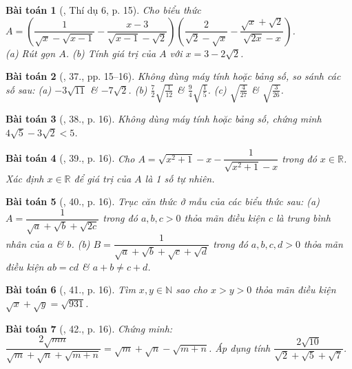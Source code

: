 \documentclass{article}
\newtheorem{baitoan}{Bài toán}
\begin{document}
\begin{baitoan}[\cite{Tuyen_Toan_9}, Thí dụ 6, p. 15]
	Cho biểu thức $A = \left(\dfrac{1}{\sqrt{x} - \sqrt{x - 1}} - \dfrac{x - 3}{\sqrt{x - 1} - \sqrt{2}}\right)\left(\dfrac{2}{\sqrt{2} - \sqrt{x}} - \dfrac{\sqrt{x} + \sqrt{2}}{\sqrt{2x} - x}\right)$.\\(a) Rút gọn $A$. (b) Tính giá trị của $A$ với $x = 3 - 2\sqrt{2}$.
\end{baitoan}

\begin{baitoan}[\cite{Tuyen_Toan_9}, 37., pp. 15--16]
	Không dùng máy tính hoặc bảng số, so sánh các số sau: (a) $-3\sqrt{11}$ \& $-7\sqrt{2}$. (b) $\frac{7}{2}\sqrt{\frac{1}{12}}$ \& $\frac{9}{4}\sqrt{\frac{1}{5}}$. (c) $\sqrt{\frac{4}{27}}$ \& $\sqrt{\frac{3}{26}}$.
\end{baitoan}

\begin{baitoan}[\cite{Tuyen_Toan_9}, 38., p. 16]
	Không dùng máy tính hoặc bảng số, chứng minh $4\sqrt{5} - 3\sqrt{2} < 5$.
\end{baitoan}

\begin{baitoan}[\cite{Tuyen_Toan_9}, 39., p. 16]
	Cho $A = \sqrt{x^2 + 1} - x - \dfrac{1}{\sqrt{x^2 + 1} - x}$ trong đó $x\in\mathbb{R}$. Xác định $x\in\mathbb{R}$ để giá trị của $A$ là 1 số tự nhiên.
\end{baitoan}

\begin{baitoan}[\cite{Tuyen_Toan_9}, 40., p. 16]
	Trục căn thức ở mẫu của các biểu thức sau: (a) $A = \dfrac{1}{\sqrt{a} + \sqrt{b} + \sqrt{2c}}$ trong đó $a,b,c > 0$ thỏa mãn điều kiện $c$ là trung bình nhân của $a$ \& $b$. (b) $B = \dfrac{1}{\sqrt{a} + \sqrt{b} + \sqrt{c} + \sqrt{d}}$ trong đó $a,b,c,d > 0$ thỏa mãn điều kiện $ab = cd$ \& $a + b\ne c + d$.
\end{baitoan}

\begin{baitoan}[\cite{Tuyen_Toan_9}, 41., p. 16]
	Tìm $x,y\in\mathbb{N}$ sao cho $x > y > 0$ thỏa mãn điều kiện $\sqrt{x} + \sqrt{y} = \sqrt{931}$.
\end{baitoan}

\begin{baitoan}[\cite{Tuyen_Toan_9}, 42., p. 16]
	Chứng minh: $\dfrac{2\sqrt{mn}}{\sqrt{m} + \sqrt{n} + \sqrt{m + n}} = \sqrt{m} + \sqrt{n} - \sqrt{m + n}$. Áp dụng tính $\dfrac{2\sqrt{10}}{\sqrt{2} + \sqrt{5} + \sqrt{7}}$.
\end{baitoan}
\end{document}
